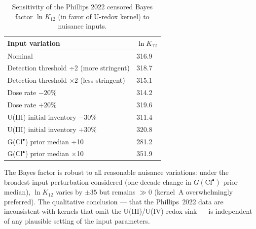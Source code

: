 \documentclass[11pt]{article}
\theoremstyle{plain}
\theoremstyle{definition}
\theoremstyle{remark}
\begin{document}
\begin{table}[h!]
\centering
\caption{Sensitivity of the Phillips 2022 censored Bayes factor
$\ln K_{12}$ (in favor of U-redox kernel) to nuisance inputs.}
\label{tab:bf-sens}
\small
\begin{tabular}{ll}
\toprule
Input variation & $\ln K_{12}$ \\
\midrule
Nominal & 316.9 \\
Detection threshold $\div$2 (more stringent) & 318.7 \\
Detection threshold $\times$2 (less stringent) & 315.1 \\
Dose rate $-20\%$ & 314.2 \\
Dose rate $+20\%$ & 319.6 \\
U(III) initial inventory $-30\%$ & 311.4 \\
U(III) initial inventory $+30\%$ & 320.8 \\
G(Cl$^{\bullet}$) prior median $\div$10 & 281.2 \\
G(Cl$^{\bullet}$) prior median $\times$10 & 351.9 \\
\bottomrule
\end{tabular}
\end{table}

The Bayes factor is robust to all reasonable nuisance variations: under the
broadest input perturbation considered (one-decade change in
$G(\mathrm{Cl}^{\bullet})$ prior median), $\ln K_{12}$ varies by
$\pm 35$ but remains $\gg 0$ (kernel~A overwhelmingly preferred).  The
qualitative conclusion --- that the Phillips~2022 data are inconsistent
with kernels that omit the U(III)/U(IV) redox sink --- is independent of
any plausible setting of the input parameters.
\end{document}
